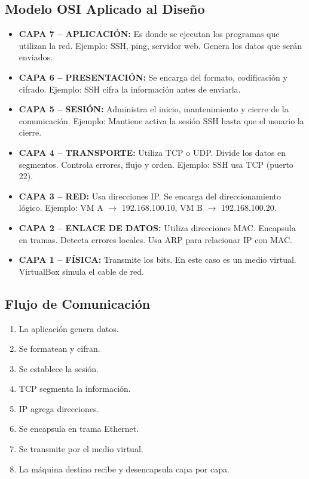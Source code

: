 \documentclass[12pt,a4paper]{report}
\begin{document}
\subsection{Modelo OSI Aplicado al Diseño}
\begin{itemize}
    \item \textbf{CAPA 7 -- APLICACIÓN:} Es donde se ejecutan los programas que utilizan la red. Ejemplo: SSH, ping, servidor web. Genera los datos que serán enviados.
    \item \textbf{CAPA 6 -- PRESENTACIÓN:} Se encarga del formato, codificación y cifrado. Ejemplo: SSH cifra la información antes de enviarla.
    \item \textbf{CAPA 5 -- SESIÓN:} Administra el inicio, mantenimiento y cierre de la comunicación. Ejemplo: Mantiene activa la sesión SSH hasta que el usuario la cierre.
    \item \textbf{CAPA 4 -- TRANSPORTE:} Utiliza TCP o UDP. Divide los datos en segmentos. Controla errores, flujo y orden. Ejemplo: SSH usa TCP (puerto 22).
    \item \textbf{CAPA 3 -- RED:} Usa direcciones IP. Se encarga del direccionamiento lógico. Ejemplo: VM A $\rightarrow$ 192.168.100.10, VM B $\rightarrow$ 192.168.100.20.
    \item \textbf{CAPA 2 -- ENLACE DE DATOS:} Utiliza direcciones MAC. Encapsula en tramas. Detecta errores locales. Usa ARP para relacionar IP con MAC.
    \item \textbf{CAPA 1 -- FÍSICA:} Transmite los bits. En este caso es un medio virtual. VirtualBox simula el cable de red.
\end{itemize}

\subsection{Flujo de Comunicación}
\begin{enumerate}
    \item La aplicación genera datos.
    \item Se formatean y cifran.
    \item Se establece la sesión.
    \item TCP segmenta la información.
    \item IP agrega direcciones.
    \item Se encapsula en trama Ethernet.
    \item Se transmite por el medio virtual.
    \item La máquina destino recibe y desencapsula capa por capa.
\end{enumerate}
\end{document}
